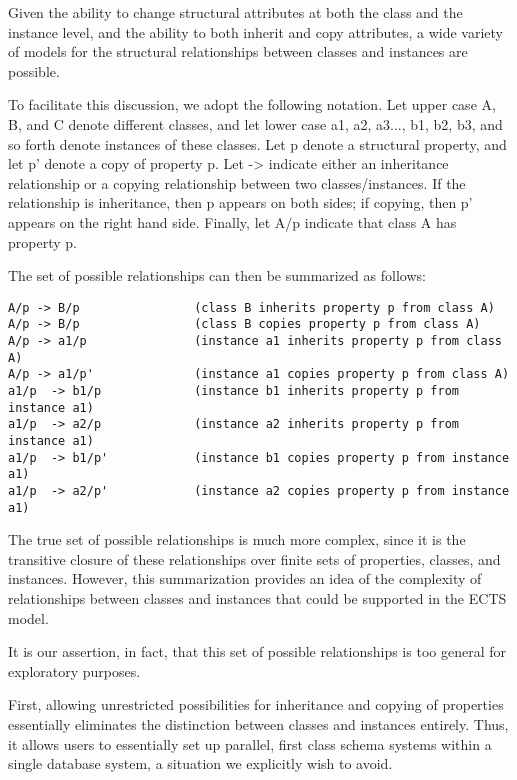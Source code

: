 Given the ability to change structural attributes at both the class
and the instance level, and the ability to both inherit and copy
attributes, a wide variety of models for the structural relationships
between classes and instances are possible.

To facilitate this discussion, we adopt the following notation.  Let upper case A, B,
and C denote different classes, and let lower case a1, a2, a3...,  b1, b2, b3, 
and so forth denote instances of these classes.  Let p denote a 
structural property, and let p' denote a copy of property p.   Let -> indicate 
either an inheritance relationship or a copying relationship between two 
classes/instances.  If the relationship is inheritance, then p appears on both 
sides; if copying, then p' appears on the right hand side.   Finally, let A/p 
indicate that class A has property p.

The set of possible relationships can then be summarized as follows:
\small\begin{verbatim}
A/p -> B/p                (class B inherits property p from class A)
A/p -> B/p                (class B copies property p from class A)
A/p -> a1/p               (instance a1 inherits property p from class A)
A/p -> a1/p'              (instance a1 copies property p from class A)
a1/p  -> b1/p             (instance b1 inherits property p from instance a1)
a1/p  -> a2/p             (instance a2 inherits property p from instance a1)
a1/p  -> b1/p'            (instance b1 copies property p from instance a1)
a1/p  -> a2/p'            (instance a2 copies property p from instance a1)
\end{verbatim}\normalsize

The true set of possible relationships is much more complex, since it is the 
transitive closure of these relationships over finite sets of properties, 
classes, and instances.  However, this summarization provides an idea of the 
complexity of relationships between classes and instances that could be 
supported in the ECTS model.

It is our assertion, in fact, that this set of possible relationships is too 
general for exploratory purposes.  

First, allowing unrestricted possibilities for inheritance and copying of 
properties essentially eliminates the distinction between classes and instances
entirely.  Thus, it allows users to essentially set up parallel, first class 
schema systems within a single database system, a situation we explicitly wish 
to avoid.  

